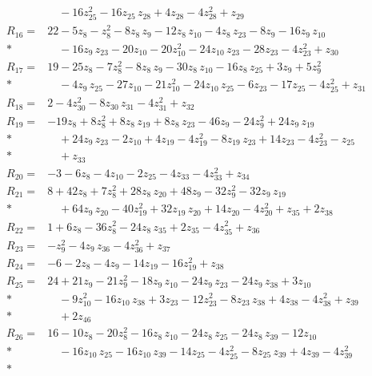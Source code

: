 \documentclass[11pt]{article}
\theoremstyle{remark}\newtheorem{remark}[theorem]{Remark}
\begin{document}
\begin{align*}
&\quad  - 16z_{25}^{2} - 16z_{25}\,z_{28} + 4z_{28} - 4z_{28}^{2} + z_{29} \\[2pt]
R_{16}={}& 22 - 5z_{8} - z_{8}^{2} - 8z_{8}\,z_{9} - 12z_{8}\,z_{10} - 4z_{8}\,z_{23} - 8z_{9} - 16z_{9}\,z_{10} \\*
&\quad  - 16z_{9}\,z_{23} - 20z_{10} - 20z_{10}^{2} - 24z_{10}\,z_{23} - 28z_{23} - 4z_{23}^{2} + z_{30} \\[2pt]
R_{17}={}& 19 - 25z_{8} - 7z_{8}^{2} - 8z_{8}\,z_{9} - 30z_{8}\,z_{10} - 16z_{8}\,z_{25} + 3z_{9} + 5z_{9}^{2} \\*
&\quad  - 4z_{9}\,z_{25} - 27z_{10} - 21z_{10}^{2} - 24z_{10}\,z_{25} - 6z_{23} - 17z_{25} - 4z_{25}^{2} + z_{31} \\[2pt]
R_{18}={}& 2 - 4z_{30}^{2} - 8z_{30}\,z_{31} - 4z_{31}^{2} + z_{32} \\[2pt]
R_{19}={}& -19z_{8} + 8z_{8}^{2} + 8z_{8}\,z_{19} + 8z_{8}\,z_{23} - 46z_{9} - 24z_{9}^{2} + 24z_{9}\,z_{19} \\*
&\quad  + 24z_{9}\,z_{23} - 2z_{10} + 4z_{19} - 4z_{19}^{2} - 8z_{19}\,z_{23} + 14z_{23} - 4z_{23}^{2} - z_{25} \\*
&\quad  + z_{33} \\[2pt]
R_{20}={}& -3 - 6z_{8} - 4z_{10} - 2z_{25} - 4z_{33} - 4z_{33}^{2} + z_{34} \\[2pt]
R_{21}={}& 8 + 42z_{8} + 7z_{8}^{2} + 28z_{8}\,z_{20} + 48z_{9} - 32z_{9}^{2} - 32z_{9}\,z_{19} \\*
&\quad  + 64z_{9}\,z_{20} - 40z_{19}^{2} + 32z_{19}\,z_{20} + 14z_{20} - 4z_{20}^{2} + z_{35} + 2z_{38} \\[2pt]
R_{22}={}& 1 + 6z_{8} - 36z_{8}^{2} - 24z_{8}\,z_{35} + 2z_{35} - 4z_{35}^{2} + z_{36} \\[2pt]
R_{23}={}& -z_{9}^{2} - 4z_{9}\,z_{36} - 4z_{36}^{2} + z_{37} \\[2pt]
R_{24}={}& -6 - 2z_{8} - 4z_{9} - 14z_{19} - 16z_{19}^{2} + z_{38} \\[2pt]
R_{25}={}& 24 + 21z_{9} - 21z_{9}^{2} - 18z_{9}\,z_{10} - 24z_{9}\,z_{23} - 24z_{9}\,z_{38} + 3z_{10} \\*
&\quad  - 9z_{10}^{2} - 16z_{10}\,z_{38} + 3z_{23} - 12z_{23}^{2} - 8z_{23}\,z_{38} + 4z_{38} - 4z_{38}^{2} + z_{39} \\*
&\quad  + 2z_{46} \\[2pt]
R_{26}={}& 16 - 10z_{8} - 20z_{8}^{2} - 16z_{8}\,z_{10} - 24z_{8}\,z_{25} - 24z_{8}\,z_{39} - 12z_{10} \\*
&\quad  - 16z_{10}\,z_{25} - 16z_{10}\,z_{39} - 14z_{25} - 4z_{25}^{2} - 8z_{25}\,z_{39} + 4z_{39} - 4z_{39}^{2} \\*

\end{align*}
\end{document}
